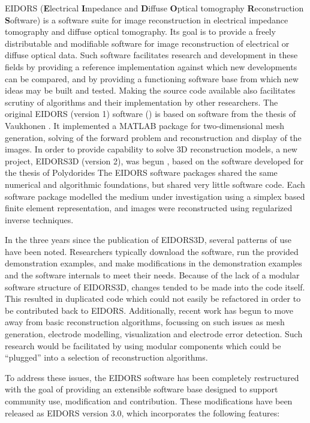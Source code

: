 \documentclass[12pt]{iopart}
\begin{document}
EIDORS
({\bf E}lectrical
 {\bf I}mpedance and
 {\bf D}iffuse
 {\bf O}ptical tomography
 {\bf R}econstruction
 {\bf S}oftware)
is a software suite for image reconstruction in
electrical impedance tomography and diffuse optical tomography.
Its goal is to provide a freely distributable and modifiable
software for image reconstruction of electrical 
or diffuse optical data. Such software facilitates research
and development
in these fields by providing a reference implementation
against which new developments can be compared, and by
providing a functioning software base from which new
ideas may be built and tested.
Making the source code available also facilitates scrutiny
of algorithms and their implementation by other researchers.
The original EIDORS (version 1) software (\cite{Vauhkonen_etal_2000})
is based on software from the thesis of Vaukhonen \cite{Vauhkonen_1997}.
It implemented a MATLAB package for two-dimensional mesh generation,
solving of the forward
problem and reconstruction and display of the images.
In order to provide capability to solve 3D reconstruction models,
a new project, EIDORS3D (version 2), was begun \cite{Polydorides_and_Lionheart_2002},
based on the software developed for the thesis of Polydorides \cite{Polydorides_2002}
The EIDORS software packages shared the same numerical
and algorithmic foundations, but shared very little software code.
Each software package modelled the medium under investigation
using a simplex based finite element representation,
and images were reconstructed using regularized inverse techniques.

In the three years since the publication of EIDORS3D, several patterns
of use have been noted. Researchers typically download the software,
run the provided demonstration examples,  and 
make modifications in the demonstration examples and the software
internals to meet their needs.
Because of the lack of a modular software structure of EIDORS3D,
changes tended to be made into the code itself. This resulted in
duplicated
code which could not easily be refactored in order to
be contributed back to EIDORS. Additionally, recent work has begun to move
away from basic reconstruction algorithms, focussing
on such issues as mesh generation, electrode modelling, visualization
and electrode error detection. Such research would be facilitated
by using modular components which could be ``plugged'' into
a selection of reconstruction algorithms.

To address these issues, the EIDORS software has been completely
restructured with the goal of providing an extensible software base
designed to support community use, modification and contribution.
These modifications have been released as EIDORS version 3.0,
which incorporates the following features:
\end{document}
